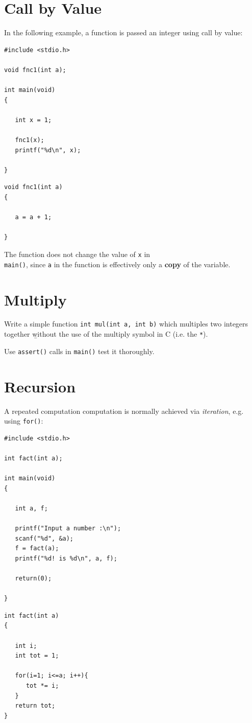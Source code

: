\documentclass[a4,portraitt]{slides}
\begin{document}
\newpage
\section*{Call by Value}

In the following example, a function is passed an integer
using call by value:

\begin{verbatim}
#include <stdio.h>

void fnc1(int a);

int main(void)
{

   int x = 1;

   fnc1(x);
   printf("%d\n", x);

}
\end{verbatim}
\newpage
\begin{verbatim}
void fnc1(int a)
{

   a = a + 1;

}
\end{verbatim}

The function does not change the value of \verb^x^ in\\
\verb^main()^, since \verb^a^ in the function is effectively
only a {\bf copy} of the variable.

\newpage
\section*{Multiply}
Write a simple function \verb^int mul(int a, int b)^ which
multiples two integers together {\b without} the use of the
multiply symbol in C (i.e. the \verb^*^).

Use \verb^assert()^ calls in \verb^main()^ test it thoroughly.

\newpage
\section*{Recursion}

{\samepage
A repeated computation computation is normally
achieved via {\it iteration}, e.g. using \verb^for()^:

\begin{verbatim}
#include <stdio.h>

int fact(int a);

int main(void)
{

   int a, f;

   printf("Input a number :\n");
   scanf("%d", &a);
   f = fact(a);
   printf("%d! is %d\n", a, f);

   return(0);

}
\end{verbatim}
}
\newpage
\begin{verbatim}
int fact(int a)
{

   int i;
   int tot = 1;

   for(i=1; i<=a; i++){
      tot *= i;
   }
   return tot;
}
\end{verbatim}
\end{document}
